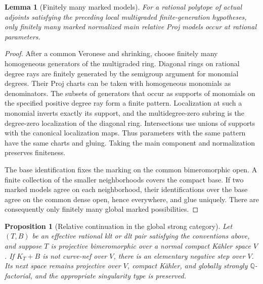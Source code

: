 \documentclass[11pt,letterpaper]{article}
\newtheorem{proposition}[theorem]{Proposition}
\newtheorem{lemma}[theorem]{Lemma}
\theoremstyle{definition}
\theoremstyle{remark}
\begin{document}
\begin{lemma}[Finitely many marked models]
\label{bir:finite-models}
For a rational polytope of actual adjoints satisfying the preceding
local multigraded finite-generation hypotheses, only finitely many
marked normalized main relative Proj models occur at rational
parameters.
\end{lemma}

\begin{proof}
After a common Veronese and shrinking, choose finitely many homogeneous
generators of the multigraded ring.  Diagonal rings on rational degree
rays are finitely generated by the semigroup argument for monomial
degrees.  Their Proj charts can be taken with homogeneous monomials as
denominators.  The subsets of generators that occur as supports of
monomials on the specified positive degree ray form a finite pattern.
Localization at such a monomial inverts exactly its support, and the
multidegree-zero subring is the degree-zero localization of the
diagonal ring.  Intersections use unions of supports with the
canonical localization maps.  Thus parameters with the same pattern
have the same charts and gluing.  Taking the main component and
normalization preserves finiteness.

The base identification fixes the marking on the common bimeromorphic
open.  A finite collection of the smaller neighborhoods covers the
compact base.  If two marked models agree on each neighborhood, their
identifications over the base agree on the common dense open, hence
everywhere, and glue uniquely.  There are consequently only finitely
many global marked possibilities.
\end{proof}

\begin{proposition}[Relative continuation in the global strong category]
\label{bir:continuation}
Let $(T,B)$ be an effective rational klt or dlt pair satisfying the
conventions above, and suppose $T$ is projective bimeromorphic over a
normal compact K\"ahler space $V$.  If $K_T+B$ is not curve-nef over
$V$, there is an elementary negative step over $V$.  Its next space
remains projective over $V$, compact K\"ahler, and globally strongly
$\mathbb{Q}$-factorial, and the appropriate singularity type is preserved.
\end{proposition}
\end{document}
